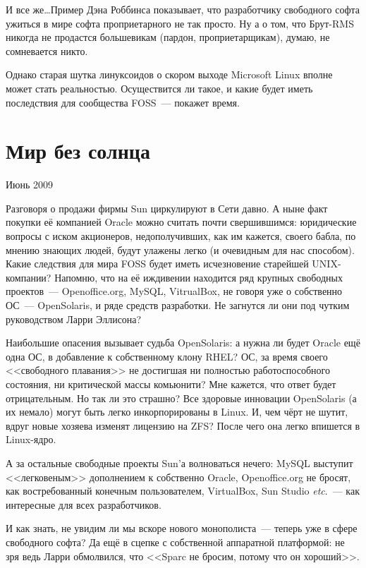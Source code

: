 И все же\dots Пример Дэна Роббинса показывает, что разработчику свободного софта ужиться в мире софта проприетарного не так просто. Ну а о том, что Брут-RMS никогда не продастся большевикам (пардон, проприетарщикам), думаю, не сомневается никто.

Однако старая шутка линуксоидов о скором выходе Microsoft Linux вполне может стать реальностью. Осуществится ли такое, и какие будет иметь последствия для сообщества FOSS~--- покажет время.

\section{Мир без солнца} 
\begin{timeline}Июнь 2009\end{timeline}

Разговоря о продажи фирмы Sun циркулируют в Сети давно. А ныне факт покупки её компанией Oracle можно считать почти свершившимся: юридические вопросы с иском акционеров, недополучивших, как им кажется, своего бабла, по мнению знающих людей, будут улажены легко (и очевидным для нас способом). Какие следствия для мира FOSS будет иметь исчезновение старейшей UNIX-компании? Напомню, что на её иждивении находится ряд крупных свободных проектов~--- Openoffice.org, MySQL, VitrualBox, не говоря уже о собственно ОС~--- OpenSolaris, и ряде средств разработки. Не загнутся ли они под чутким руководством Ларри Эллисона? 

Наибольшие опасения вызывает судьба OpenSolaris: а нужна ли будет Oracle ещё одна ОС, в добавление к собственному клону RHEL? ОС, за время своего <<свободного плавания>> не достигшая ни полностью работоспособного состояния, ни критической массы комьюнити? Мне кажется, что ответ будет отрицательным. Но так ли это страшно? Все здоровые инновации OpenSolaris (а их немало) могут быть легко инкорпорированы в Linux. И, чем чёрт не шутит, вдруг новые хозяева изменят лицензию на ZFS? После чего она легко впишется в Linux-ядро.

А за остальные свободные проекты Sun'а волноваться нечего: MySQL выступит <<легковеным>> дополнением к собственно Oracle, Openoffice.org не бросят, как востребованный конечным пользователем, VirtualBox, Sun Studio \textit{etc}.~--- как интересные для всех разработчиков.

И как знать, не увидим ли мы вскоре нового монополиста~--- теперь уже в сфере свободного софта? Да ещё в сцепке с собственной аппаратной платформой: не зря ведь Ларри обмолвился, что <<Sparc не бросим, потому что он хороший>>.